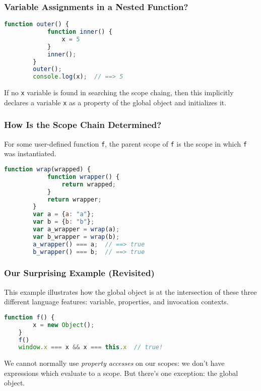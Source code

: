 \begin{frame}[fragile]
    \frametitle{Variable Assignments in a Nested Function?}
    \begin{lstlisting}[language=JavaScript]
        function outer() {
            function inner() {
                x = 5
            }
            inner();
        }
        outer();
        console.log(x);  // ==> 5
    \end{lstlisting}

    If no \texttt{x} variable is found in searching the scope chaing, then this
    implicitly declares a variable \texttt{x} as a property of the global object
    and initializes it.\footnotemark

\end{frame}

\begin{frame}[fragile]
    \frametitle{How Is the Scope Chain Determined?}
    For some user-defined function \texttt{f}, the parent scope of \texttt{f} is
    the scope in which \texttt{f} was instantiated.
    \begin{lstlisting}[language=JavaScript]
        function wrap(wrapped) {
            function wrapper() {
                return wrapped;
            }
            return wrapper;
        }
        var a = {a: "a"};
        var b = {b: "b"};
        var a_wrapper = wrap(a);
        var b_wrapper = wrap(b);
        a_wrapper() === a;  // ==> true
        b_wrapper() === b;  // ==> true
    \end{lstlisting}
\end{frame}

\begin{frame}[fragile]
    \frametitle{Our Surprising Example (Revisited)}
    This example illustrates how the global object is at the intersection of
    these three different language features: variable, properties, and
    invocation contexts.

    \begin{lstlisting}[language=JavaScript]
    function f() {
        x = new Object();
    }
    f()
    window.x === x && x === this.x  // true!
    \end{lstlisting}

    We cannot normally use \textit{property accesses} on our scopes: we don't
    have expressions which evaluate to a scope. But there's one exception: the
    global object.
\end{frame}
